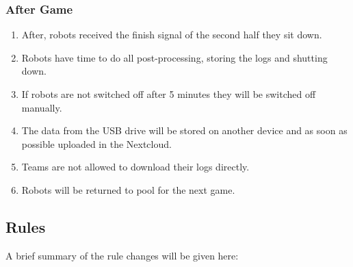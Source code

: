 \subsubsection{After Game}
	
	\begin{enumerate}
		\item After, robots received the finish signal of the second half they sit down.
		\item Robots have time to do all post-processing, storing the logs and shutting down.
		\item If robots are not switched off after 5 minutes they will be switched off manually.
		\item The data from the USB drive will be stored on another device and as soon as possible uploaded in the Nextcloud.
		\item Teams are not allowed to download their logs directly.
		\item Robots will be returned to pool for the next game.
	\end{enumerate}


\subsection{Rules}
A brief summary of the rule changes will be given here:

